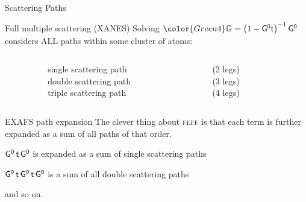 \begin{frame}{Scattering Paths}
  \begin{block}{Full multiple scattering (XANES)}
    Solving {\color{DarkOrchid4} ${\color{Green4}\GMS} = \big(1 -
      \Gnot \tmat\big)^{-1} \, \Gnot$} considers {\LARGE ALL} paths
    within some cluster of atoms:
  \end{block}
  \begin{columns}[T]
    \begin{column}{0.2\linewidth}
      ~
    \end{column}
    \begin{column}{0.35\linewidth}
      {\color{DarkOrchid4}single scattering path}\\
      {\color{DarkOrchid4}double scattering path}\\
      {\color{DarkOrchid4}triple scattering path}
    \end{column}
    \begin{column}{0.1\linewidth}
      {\color{blue}\SS}\\
      ~\\
      ~
    \end{column}
    \begin{column}{0.15\linewidth}
      (2 legs)\\
      (3 legs)\\
      (4 legs)
    \end{column}
    \begin{column}{0.2\linewidth}
      ~
    \end{column}
  \end{columns}

  \medskip

  \begin{exampleblock}{EXAFS path expansion}
    The clever thing about \textsc{feff} is that each term is further
    expanded as a sum of all paths of that order.

    \medskip

    {\color{DarkOrchid4}$\mathsf{G^0}\,\mathsf{t}\,\mathsf{G^0}$} is expanded as a sum of
    {\color{DarkOrchid4}single scattering} paths

    \medskip

    {\color{DarkOrchid4}$\mathsf{G^0}\,\mathsf{t}\,\mathsf{G^0}\,\mathsf{t}\,\mathsf{G^0}$} is a sum
    of all {\color{DarkOrchid4}double scattering} paths

    \medskip

    and so on.
  \end{exampleblock}

\end{frame}
